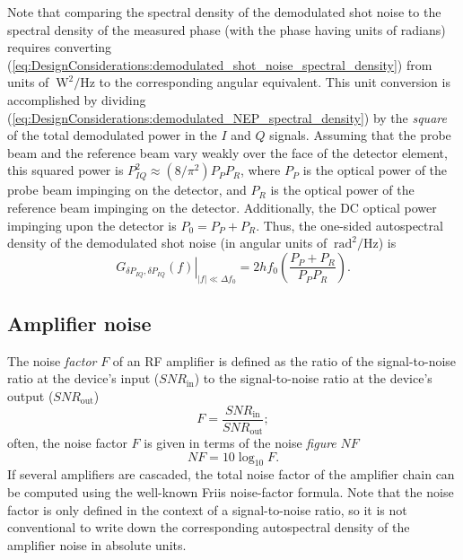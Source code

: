 Note that comparing the spectral density
of the demodulated shot noise
to the spectral density of the measured phase
(with the phase having units of radians)
requires converting
(\ref{eq:DesignConsiderations:demodulated_shot_noise_spectral_density})
from units of $\SI{}{\watt\squared\per\Hz}$
to the corresponding angular equivalent.
This unit conversion is accomplished by dividing
(\ref{eq:DesignConsiderations:demodulated_NEP_spectral_density})
by the \emph{square} of the total demodulated power in the $I$ and $Q$ signals.
Assuming that the probe beam and the reference beam
vary weakly over the face of the detector element,
this squared power is
$P_{IQ}^2 \approx (8 / \pi^2) P_P P_R$, where
$P_P$ is the optical power of the probe beam impinging on the detector, and
$P_R$ is the optical power of the reference beam impinging on the detector.
Additionally, the DC optical power impinging upon the detector is
$P_0 = P_P + P_R$.
Thus, the one-sided autospectral density of the demodulated shot noise
(in angular units of $\SI{}{\radian\squared\per\Hz}$) is
\begin{equation}
  \left.
    G_{\delta P_{IQ}, \delta P_{IQ}}(f)
  \right|_{|f| \ll \Delta f_0}
  =
  2 h f_0 \left( \frac{P_P + P_R}{P_P P_R} \right).
\end{equation}


\subsection{Amplifier noise}
\label{sec:DesignConsiderations:amplitude_noise:amplifier}
The noise \emph{factor} $F$ of an RF amplifier is defined as the ratio of
the signal-to-noise ratio at the device's input ($SNR_{\text{in}}$) to
the signal-to-noise ratio at the device's output ($SNR_{\text{out}}$)
\begin{equation}
  F = \frac{SNR_{\text{in}}}{SNR_{\text{out}}};
\end{equation}
often, the noise factor $F$ is given
in terms of the noise \emph{figure} $NF$
\cite{minicircuits_amplifier_terms_defined}
\begin{equation}
  NF = 10 \log_{10} F.
\end{equation}
If several amplifiers are cascaded,
the total noise factor of the amplifier chain
can be computed using the well-known Friis noise-factor formula.
Note that the noise factor is only defined
in the context of a signal-to-noise ratio, so
it is not conventional to write down the corresponding
autospectral density of the amplifier noise in absolute units.


